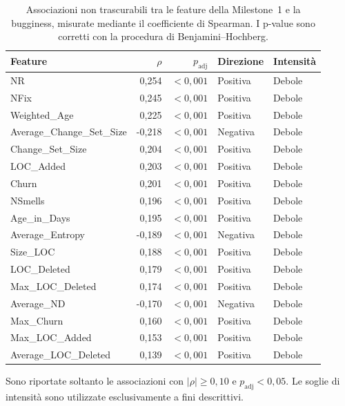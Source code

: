 \begin{table}[htbp]
\centering
\small
\caption{Associazioni non trascurabili tra le feature della Milestone~1 e la bugginess, misurate mediante il coefficiente di Spearman. I p-value sono corretti con la procedura di Benjamini--Hochberg.}
\label{tab:feature-bugginess-correlation}
\begin{tabular}{lrrll}
\toprule
\textbf{Feature} & \textbf{$\rho$} & \textbf{$p_{\mathrm{adj}}$} & \textbf{Direzione} & \textbf{Intensità} \\
\midrule
NR & 0{,}254 & $<0{,}001$ & Positiva & Debole \\
NFix & 0{,}245 & $<0{,}001$ & Positiva & Debole \\
Weighted\_Age & 0{,}225 & $<0{,}001$ & Positiva & Debole \\
Average\_Change\_Set\_Size & -0{,}218 & $<0{,}001$ & Negativa & Debole \\
Change\_Set\_Size & 0{,}204 & $<0{,}001$ & Positiva & Debole \\
LOC\_Added & 0{,}203 & $<0{,}001$ & Positiva & Debole \\
Churn & 0{,}201 & $<0{,}001$ & Positiva & Debole \\
NSmells & 0{,}196 & $<0{,}001$ & Positiva & Debole \\
Age\_in\_Days & 0{,}195 & $<0{,}001$ & Positiva & Debole \\
Average\_Entropy & -0{,}189 & $<0{,}001$ & Negativa & Debole \\
Size\_LOC & 0{,}188 & $<0{,}001$ & Positiva & Debole \\
LOC\_Deleted & 0{,}179 & $<0{,}001$ & Positiva & Debole \\
Max\_LOC\_Deleted & 0{,}174 & $<0{,}001$ & Positiva & Debole \\
Average\_ND & -0{,}170 & $<0{,}001$ & Negativa & Debole \\
Max\_Churn & 0{,}160 & $<0{,}001$ & Positiva & Debole \\
Max\_LOC\_Added & 0{,}153 & $<0{,}001$ & Positiva & Debole \\
Average\_LOC\_Deleted & 0{,}139 & $<0{,}001$ & Positiva & Debole \\
\bottomrule
\end{tabular}
\vspace{1mm}
\parbox{0.95\textwidth}{\footnotesize Sono riportate soltanto le associazioni con $|\rho|\geq 0{,}10$ e $p_{\mathrm{adj}}<0{,}05$. Le soglie di intensità sono utilizzate esclusivamente a fini descrittivi.}
\end{table}

